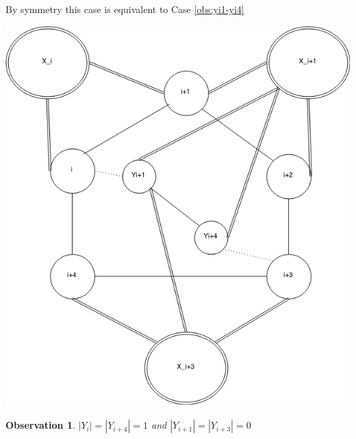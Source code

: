 \documentclass[12pt]{article}
\newtheorem{Observation}[Theorem]{Observation}
\begin{document}
\begin{minipage}{0.5\textwidth}%
	 By symmetry this case is equivalent to Case \ref{obs:yi1-yi4}
\end{minipage}
\hfill
\begin{minipage}{0.5\textwidth}\raggedleft
	\includegraphics[width=\linewidth]{Yi-Yi3.png}
\end{minipage}


\begin{Observation}\label{obs:yi-yi4}
$|Y_{i}| = |Y_{i+4}| = 1$ and $|Y_{i+1}| = |Y_{i+3}| = 0$
\end{Observation}
\end{document}
